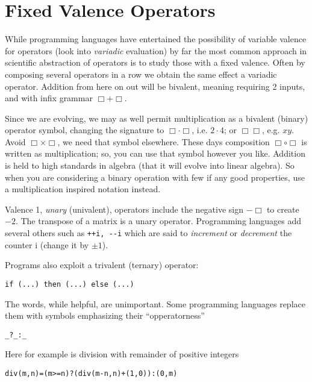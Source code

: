 \section{Fixed Valence Operators}
While programming languages have entertained the possibility of 
variable valence for operators (look into \emph{variadic} evaluation)
by far the most common approach in scientific abstraction of operators 
is to study those with a fixed valence.  Often by composing several 
operators in a row we obtain the same effect a  variadic 
operator.  Addition from here on out will be bivalent, meaning 
requiring 2 inputs, and with infix grammar $\Box +\Box$.


Since we are evolving, we may as well permit multiplication as a bivalent (binary) operator
symbol, changing the signature to $\Box \cdot \Box$, i.e. $2\cdot 4$; or
$\Box\Box$, e.g. $xy$.   Avoid $\Box\times \Box$, we need that symbol elsewhere.
These days composition $\Box\circ\Box$ is written as multiplication; so, you can
use that symbol however you like.  Addition is held to high standards in algebra
(that it will evolve into linear algebra).  So when you are considering a binary
operation with few if any good properties, use a multiplication inspired
notation instead.   





Valence 1, \emph{unary} (univalent), operators include the negative sign $-\Box$ to create 
$-2$.  The transpose of a matrix is a unary operator.  Programming languages add several others 
such as \lstinline{++i, --i} which are said to \emph{increment} 
or \emph{decrement} the counter i (change it by $\pm 1$).

Programs also exploit a trivalent (ternary) operator:
\begin{center}
    \lstinline[language=Sava]{if (...) then (...) else (...)}
\end{center}
The words, while helpful, are unimportant.  Some programming languages 
replace them with symbols emphasizing their ``opperatorness'' 
\begin{center}
    \lstinline[language=Sava]{_?_:_}
\end{center}
Here for example is division with remainder of positive integers
\begin{center}
\begin{lstlisting}[language=Sava,mathescape]
div(m,n)=(m>=n)?(div(m-n,n)+(1,0)):(0,m)
\end{lstlisting}
\end{center}

